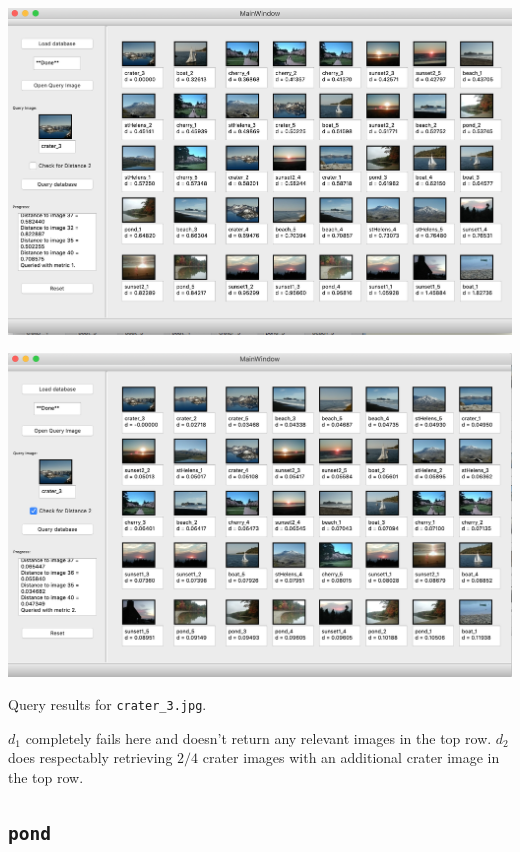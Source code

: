 \documentclass[letterpaper]{article}
\begin{document}
\begin{center}
  \includegraphics[width=\textwidth]{crater_3_distance1.png}
  
  \includegraphics[width=\textwidth]{crater_3_distance2.png}
  
  Query results for \texttt{crater\_3.jpg}.  
\end{center}

$d_1$ completely fails here and doesn't return any relevant images in the top
row. $d_2$ does respectably retrieving $2/4$ crater images with an additional
crater image in the top row.

\subsection{\texttt{pond}}
\end{document}
